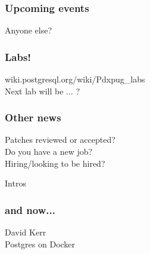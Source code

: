\documentclass{beamer}
\begin{document}
\frame
{
  \frametitle{Upcoming events}
  \begin{center}
Anyone else?
  \end{center}
}

\frame
{
  \frametitle{Labs!}
  \begin{center}
wiki.postgresql.org/wiki/Pdxpug\_labs\\
Next lab will be  ... ?
  \end{center}
}

\frame
{
  \frametitle{Other news}
  \begin{center}
Patches reviewed or accepted?\\
Do you have a new job?\\
Hiring/looking to be hired?
  \end{center}
}

\frame
{
  \begin{center}
  {\huge Intros}
  \end{center}
}

\frame
{
  \frametitle{and now...}
  \begin{center}
{\huge David Kerr}\\
Postgres on Docker
  \end{center}
}
\end{document}
